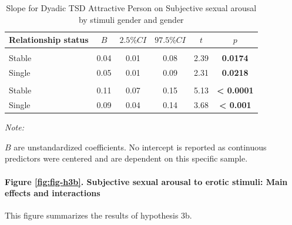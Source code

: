 \documentclass[
  bookmarksnumbered]{article}
\begin{document}
\begin{table}[H]
\centering
\caption{\label{tab:unnamed-chunk-30}Slope for Dyadic TSD Attractive Person on
        Subjective sexual arousal by stimuli gender and gender}
\centering
\begin{threeparttable}
\begin{tabular}[t]{lccccc}
\toprule
Relationship status & $B$ & $2.5\% CI$ & $97.5\% CI$ & $t$ & $p$\\
\midrule
\addlinespace[0.3em]
\multicolumn{6}{l}{\cellcolor{lightgray}{Gender: Women}}\\
\hspace{1em}Stable & 0.04 & 0.01 & 0.08 & 2.39 & \textbf{0.0174}\\
\hspace{1em}Single & 0.05 & 0.01 & 0.09 & 2.31 & \textbf{0.0218}\\
\addlinespace[0.3em]
\multicolumn{6}{l}{\cellcolor{lightgray}{Gender: Men}}\\
\hspace{1em}Stable & 0.11 & 0.07 & 0.15 & 5.13 & \textbf{< 0.0001}\\
\hspace{1em}Single & 0.09 & 0.04 & 0.14 & 3.68 & \textbf{< 0.001}\\
\bottomrule
\end{tabular}
\begin{tablenotes}[para]
\item \textit{Note: } 
\item $B$ are unstandardized coefficients.
           No intercept is reported as continuous predictors were centered
           and are dependent on this specific sample.
\end{tablenotes}
\end{threeparttable}
\end{table}

\paragraph{Figure \ref{fig:fig-h3b}. Subjective sexual arousal to erotic stimuli: Main effects and interactions}\label{figure-reffigfig-h3b.-subjective-sexual-arousal-to-erotic-stimuli-main-effects-and-interactions}

This figure summarizes the results of hypothesis 3b.
\end{document}
